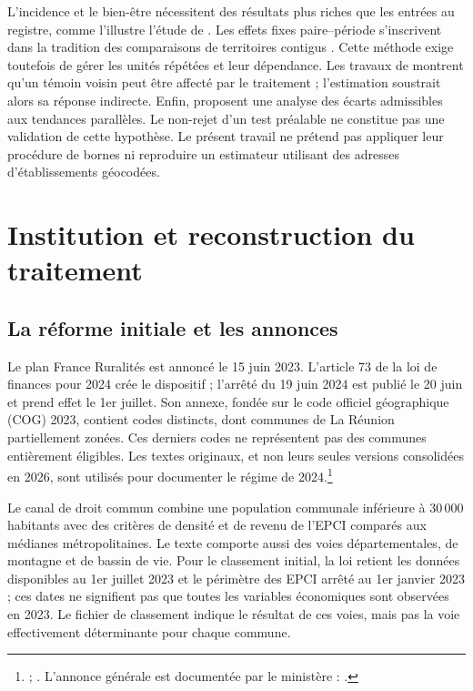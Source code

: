 L’incidence et le bien-être nécessitent des résultats plus riches que les entrées au registre, comme l’illustre l’étude de \citet{ref6}. Les effets fixes paire–période s’inscrivent dans la tradition des comparaisons de territoires contigus \citep{ref9}. Cette méthode exige toutefois de gérer les unités répétées et leur dépendance. Les travaux de \citet{ref7,ref8} montrent qu’un témoin voisin peut être affecté par le traitement ; l’estimation soustrait alors sa réponse indirecte. Enfin, \citet{ref10} proposent une analyse des écarts admissibles aux tendances parallèles. Le non-rejet d’un test préalable ne constitue pas une validation de cette hypothèse. Le présent travail ne prétend pas appliquer leur procédure de bornes ni reproduire un estimateur utilisant des adresses d’établissements géocodées.

\section{Institution et reconstruction du traitement}
\subsection{La réforme initiale et les annonces}
Le plan France Ruralités est annoncé le 15 juin 2023. L’article 73 de la loi de finances pour 2024 crée le dispositif ; l’arrêté du 19 juin 2024 est publié le 20 juin et prend effet le 1er juillet. Son annexe, fondée sur le code officiel géographique (COG) 2023, contient \FRRInitialN{} codes distincts, dont \FRRInitialPartialN{} communes de La Réunion partiellement zonées. Ces derniers codes ne représentent pas des communes entièrement éligibles. Les textes originaux, et non leurs seules versions consolidées en 2026, sont utilisés pour documenter le régime de 2024.\footnote{ ; . L’annonce générale est documentée par le ministère : .}

Le canal de droit commun combine une population communale inférieure à 30\,000 habitants avec des critères de densité et de revenu de l’EPCI comparés aux médianes métropolitaines. Le texte comporte aussi des voies départementales, de montagne et de bassin de vie. Pour le classement initial, la loi retient les données disponibles au 1er juillet 2023 et le périmètre des EPCI arrêté au 1er janvier 2023 ; ces dates ne signifient pas que toutes les variables économiques sont observées en 2023. Le fichier de classement indique le résultat de ces voies, mais pas la voie effectivement déterminante pour chaque commune.


